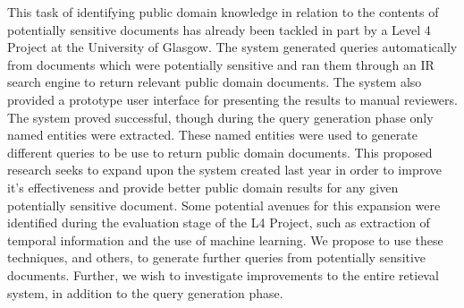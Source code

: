 \documentclass{mprop}
\begin{document}
This task of identifying public domain knowledge in relation to the contents of potentially sensitive documents has already been tackled in part by a Level 4 Project at the University of Glasgow. 
The system generated queries automatically from documents which were potentially sensitive and ran them through an IR search engine to return relevant public domain documents.
The system also provided a prototype user interface for presenting the results to manual reviewers.
The system proved successful, though during the query generation phase only named entities were extracted.
These named entities were used to generate different queries to be use to return public domain documents.
This proposed research seeks to expand upon the system created last year in order to improve it's effectiveness and provide better public domain results for any given potentially sensitive document.
Some potential avenues for this expansion were identified during the evaluation stage of the L4 Project, such as extraction of temporal information and the use of machine learning.
We propose to use these techniques, and others, to generate further queries from potentially sensitive documents.
Further, we wish to investigate improvements to the entire retieval system, in addition to the query generation phase.



\end{document}
